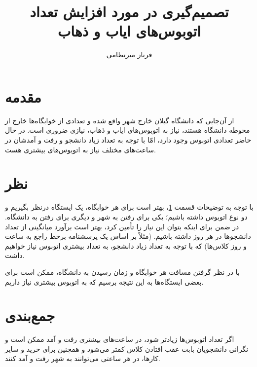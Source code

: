 \documentclass{article}
\begin{document}
\title{تصمیم‌گیری در مورد افزایش تعداد اتوبوس‌های ایاب و ذهاب}
\author{فرناز میرنظامی}
\maketitle
\section{مقدمه} \label{sec:intro}
از آن‌جایی که دانشگاه گیلان خارج شهر واقع شده و تعدادی از خوابگاه‌ها خارج از محوطه دانشگاه هستند، نیاز به اتوبوس‌های ایاب و ذهاب، نیازی ضروری است. در حال حاضر تعدادی اتوبوس وجود دارد، امّا با توجه به تعداد زیاد دانشجو و رفت و آمد‌شان در ساعت‌های مختلف نیاز به اتوبوس‌های بیشتری هست.

\section{نظر}
با توجه به توضیحات قسمت \ref{sec:intro}، 
بهتر است برای هر خوابگاه، یک ایستگاه درنظر بگیریم و دو نوع اتوبوس داشته باشیم؛ یکی برای رفتن به شهر و دیگری برای رفتن به دانشگاه. در ضمن برای اینکه بتوان این نیاز را تأمین کرد، بهتر است برآورد میانگینی از تعداد دانشجوها در هر روز داشته باشیم. (مثلاً بر اساس یک پرسشنامه برخط راجع به ساعت و روز کلاس‌ها) که با توجه به تعداد زیاد دانشجو، به تعداد بیشتری اتوبوس نیاز خواهیم داشت.

با در نظر گرفتن مسافت هر خوابگاه و زمان رسیدن به دانشگاه، ممکن است برای بعضی ایستگاه‌ها به این نتیجه برسیم که به اتوبوس بیشتری نیاز داریم.
\section{جمع‌بندی}
اگر تعداد اتوبوس‌ها زیادتر شود، در ساعت‌های بیشتری رفت و آمد ممکن است و نگرانی دانشجویان بابت عقب افتادن کلاس کمتر می‌شود و همچنین برای خرید و سایر کارها، در هر ساعتی می‌توانند به شهر رفت و آمد کنند.
\end{document}
